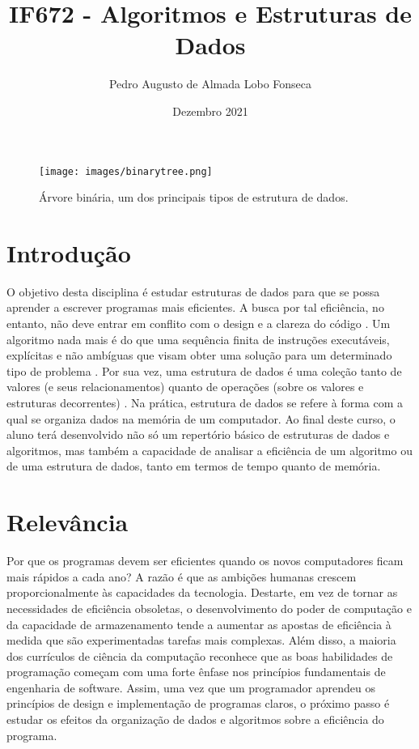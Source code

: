\documentclass[12pt]{article}
\title{IF672 - Algoritmos e Estruturas de Dados}
\author{Pedro Augusto de Almada Lobo Fonseca}
\date{Dezembro 2021}
\begin{document}
\maketitle

\begin{figure}[h]
    \centering
    \texttt{[image: images/binarytree.png]}
    \caption{Árvore binária, um dos principais tipos de estrutura de dados.} \cite{binarytree}
    \label{fig:binarytree}
\end{figure}

\section{Introdução}
O objetivo desta disciplina é estudar estruturas de dados para que se possa aprender a escrever programas mais eficientes. A busca por tal eficiência, no entanto, não deve entrar em conflito com o design e a clareza do código \cite{CInWiki_algoritmos}. Um algoritmo nada mais é do que uma sequência finita de instruções executáveis, explícitas e não ambíguas que visam obter uma solução para um determinado tipo de problema \cite{algoritmo}. Por sua vez, uma estrutura de dados é uma coleção tanto de valores (e seus relacionamentos) quanto de operações (sobre os valores e estruturas decorrentes) \cite{estrutura_de_dados}. Na prática, estrutura de dados se refere à forma com a qual se organiza dados na memória de um computador. Ao final deste curso, o aluno terá desenvolvido não só um repertório básico de estruturas de dados e algoritmos, mas também a capacidade de analisar a eficiência de um algoritmo ou de uma estrutura de dados, tanto em termos de tempo quanto de memória.

\section{Relevância}
Por que os programas devem ser eficientes quando os novos computadores ficam mais rápidos a cada ano? A razão é que as ambições humanas crescem proporcionalmente às capacidades da tecnologia. Destarte, em vez de tornar as necessidades de eficiência obsoletas, o desenvolvimento do poder de computação e da capacidade de armazenamento tende a aumentar as apostas de eficiência à medida que são experimentadas tarefas mais complexas. Além disso, a maioria dos currículos de ciência da computação reconhece que as boas habilidades de programação começam com uma forte ênfase nos princípios fundamentais de engenharia de software. Assim, uma vez que um programador aprendeu os princípios de design e implementação de programas claros, o próximo passo é estudar os efeitos da organização de dados e algoritmos sobre a eficiência do programa.  \cite{CInWiki_algoritmos}
\end{document}
